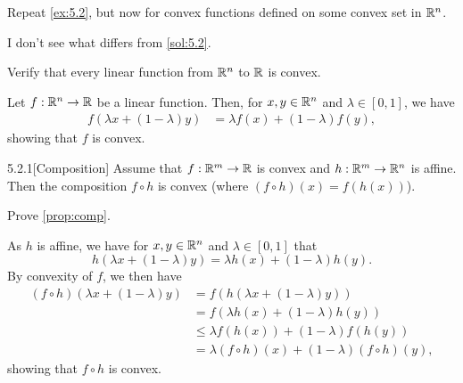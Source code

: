 \begin{exercise}
  Repeat \cref{ex:5.2}, but now for convex functions defined on some convex set in $\mathbb{R}^n$.
\end{exercise}

\begin{solution}
  I don't see what differs from \cref{sol:5.2}.
\end{solution}

\begin{exercise}
  Verify that every linear function from $\mathbb{R}^n$ to $\mathbb{R}$ is convex.
\end{exercise}

\begin{solution}
  Let $f: \mathbb{R}^n \to \mathbb{R}$ be a linear function.
  Then, for $x, y \in \mathbb{R}^n$ and $\lambda \in [0, 1]$, we have
  \begin{align*}
    f( \lambda x + (1 - \lambda) y )
    &= \lambda f(x) + (1 - \lambda) f(y),
  \end{align*}
  showing that $f$ is convex.
\end{solution}

\begin{manualprop}{5.2.1}[Composition]\label{prop:comp}
  Assume that $f : \mathbb{R}^m \to \mathbb{R}$ is convex and $h : \mathbb{R}^m \to \mathbb{R}^n$ is affine.
  Then the composition $f \circ h$ is convex (where $(f \circ h)(x) = f(h(x))$).
\end{manualprop}

\begin{exercise}
  Prove \cref{prop:comp}.
\end{exercise}

\begin{solution}
  As $h$ is affine, we have for $x, y \in \mathbb{R}^n$ and $\lambda \in [0, 1]$ that
  \begin{equation}
    h( \lambda x + (1 - \lambda) y )
    = \lambda h(x) + (1 - \lambda) h(y).
  \end{equation}
  By convexity of $f$, we then have
  \begin{align*}
    (f \circ h)( \lambda x + (1 - \lambda) y )
    &= f( h( \lambda x + (1 - \lambda) y ) ) \\
    &= f( \lambda h(x) + (1 - \lambda) h(y) ) \\
    &\leq \lambda f( h(x) ) + (1 - \lambda) f( h(y) ) \\
    &= \lambda (f \circ h)(x) + (1 - \lambda) (f \circ h)(y),
  \end{align*}
  showing that $f \circ h$ is convex.
\end{solution}

